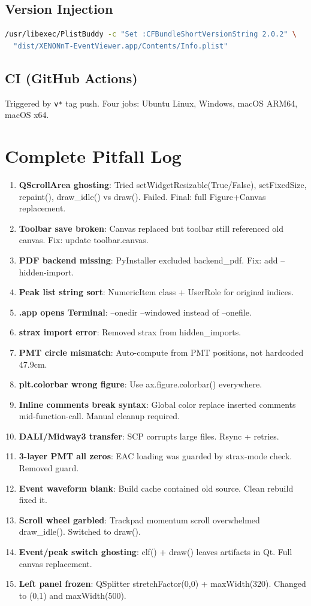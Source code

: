 \documentclass[12pt,a4paper]{article}
\begin{document}
\subsection{Version Injection}
\begin{lstlisting}[language=bash]
/usr/libexec/PlistBuddy -c "Set :CFBundleShortVersionString 2.0.2" \
  "dist/XENONnT-EventViewer.app/Contents/Info.plist"
\end{lstlisting}

\subsection{CI (GitHub Actions)}
Triggered by \texttt{v*} tag push. Four jobs: Ubuntu Linux, Windows, macOS ARM64, macOS x64.

\section{Complete Pitfall Log}

\begin{enumerate}[itemsep=4pt]
\item \textbf{QScrollArea ghosting}: Tried setWidgetResizable(True/False), setFixedSize, repaint(), draw\_idle() vs draw(). Failed. Final: full Figure+Canvas replacement.
\item \textbf{Toolbar save broken}: Canvas replaced but toolbar still referenced old canvas. Fix: update toolbar.canvas.
\item \textbf{PDF backend missing}: PyInstaller excluded backend\_pdf. Fix: add --hidden-import.
\item \textbf{Peak list string sort}: NumericItem class + UserRole for original indices.
\item \textbf{.app opens Terminal}: --onedir --windowed instead of --onefile.
\item \textbf{strax import error}: Removed strax from hidden\_imports.
\item \textbf{PMT circle mismatch}: Auto-compute from PMT positions, not hardcoded 47.9cm.
\item \textbf{plt.colorbar wrong figure}: Use ax.figure.colorbar() everywhere.
\item \textbf{Inline comments break syntax}: Global color replace inserted comments mid-function-call. Manual cleanup required.
\item \textbf{DALI/Midway3 transfer}: SCP corrupts large files. Rsync + retries.
\item \textbf{3-layer PMT all zeros}: EAC loading was guarded by strax-mode check. Removed guard.
\item \textbf{Event waveform blank}: Build cache contained old source. Clean rebuild fixed it.
\item \textbf{Scroll wheel garbled}: Trackpad momentum scroll overwhelmed draw\_idle(). Switched to draw().
\item \textbf{Event/peak switch ghosting}: clf() + draw() leaves artifacts in Qt. Full canvas replacement.
\item \textbf{Left panel frozen}: QSplitter stretchFactor(0,0) + maxWidth(320). Changed to (0,1) and maxWidth(500).
\end{enumerate}
\end{document}
